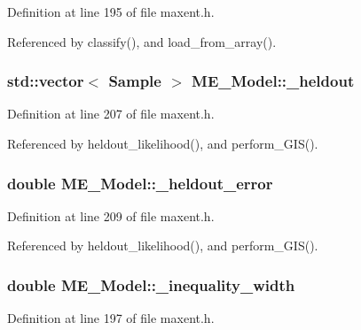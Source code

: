 Definition at line 195 of file maxent.h.

Referenced by classify(), and load\_\-from\_\-array().\hypertarget{classME__Model_ee10259b3dbbc99acb9c0f0e200b598b}{
\subsubsection[{\_\-heldout}]{\setlength{\rightskip}{0pt plus 5cm}std::vector$<$ {\bf Sample} $>$ {\bf ME\_\-Model::\_\-heldout}}}
\label{classME__Model_ee10259b3dbbc99acb9c0f0e200b598b}




Definition at line 207 of file maxent.h.

Referenced by heldout\_\-likelihood(), and perform\_\-GIS().\hypertarget{classME__Model_daf5973e7d0bf53c3d747da90dc20036}{
\subsubsection[{\_\-heldout\_\-error}]{\setlength{\rightskip}{0pt plus 5cm}double {\bf ME\_\-Model::\_\-heldout\_\-error}}}
\label{classME__Model_daf5973e7d0bf53c3d747da90dc20036}




Definition at line 209 of file maxent.h.

Referenced by heldout\_\-likelihood(), and perform\_\-GIS().\hypertarget{classME__Model_8fe5e308a2901c6792abe6c305491bcd}{
\subsubsection[{\_\-inequality\_\-width}]{\setlength{\rightskip}{0pt plus 5cm}double {\bf ME\_\-Model::\_\-inequality\_\-width}}}
\label{classME__Model_8fe5e308a2901c6792abe6c305491bcd}




Definition at line 197 of file maxent.h.

